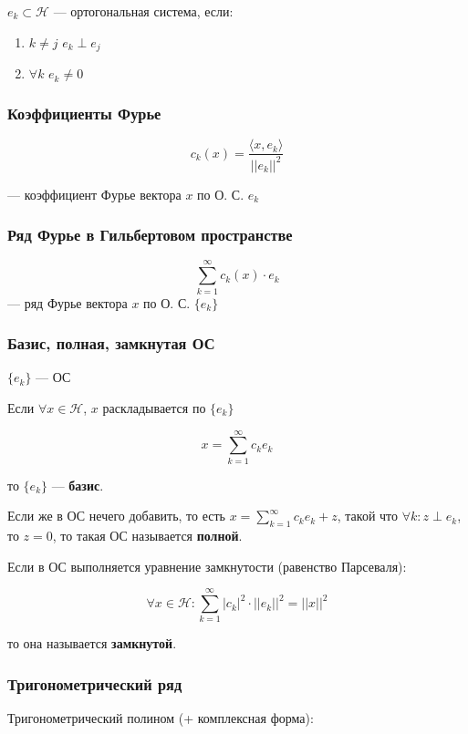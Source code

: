 \documentclass{article}
\def\dbl{\,\,}
\begin{document}
${e_k} \subset \mathcal{H}$ --- ортогональная система, если:

\begin{enumerate}
    \item $k \neq j \dbl e_k \perp e_j$
    \item $\forall k \dbl e_k \neq 0$
\end{enumerate}

\subsubsection{Коэффициенты Фурье}

\[c_k(x) = \frac{\langle x, e_k \rangle}{||e_k||^2}\]

--- коэффициент Фурье вектора $x$ по О. С. $e_k$

\subsubsection{Ряд Фурье в Гильбертовом пространстве}

\[\sum_{k = 1}^{\infty} c_k(x) \cdot e_k\]
--- ряд Фурье вектора $x$ по О. С. $\{e_k\}$

\subsubsection{Базис, полная, замкнутая ОС}

$\{e_k\}$ --- ОС

Если $\forall x \in \mathcal{H}$, $x$ раскладывается по $\{e_k\}$ 

\[x = \sum_{k = 1}^{\infty} c_k e_k\] 

то $\{e_k\}$ --- \textbf{базис}.

Если же в ОС нечего добавить, то есть $x = \sum_{k = 1}^{\infty} c_k e_k + z$, такой что $\forall k : z \perp e_k$, то $z = 0$, то такая ОС называется \textbf{полной}.

Если в ОС выполняется уравнение замкнутости (равенство Парсеваля):

\[\forall x \in \mathcal{H} : \sum_{k = 1}^{\infty} |c_k|^2 \cdot ||e_k||^2 = ||x||^2\]

то она называется \textbf{замкнутой}.


\subsubsection{Тригонометрический ряд}

Тригонометрический полином (+ комплексная форма):
\end{document}
